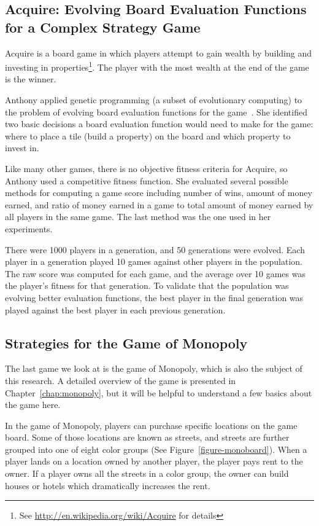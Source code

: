 \subsection{Acquire: Evolving Board Evaluation Functions for a Complex Strategy
Game}

Acquire is a board game in which players attempt to gain wealth by building and
investing in properties\footnote{See \url{http://en.wikipedia.org/wiki/Acquire}
for details}. The player with the most wealth at the end of the game is the
winner.

Anthony applied genetic programming (a subset of evolutionary computing) to the
problem of evolving board evaluation functions for the game~\cite{Anthony2002}.
She identified two basic decisions a board evaluation function would need to
make for the game: where to place a tile (build a property) on the board and
which property to invest in.

Like many other games, there is no objective fitness criteria for Acquire, so
Anthony used a competitive fitness function. She evaluated several possible
methods for computing a game score including number of wins, amount of money
earned, and ratio of money earned in a game to total amount of money earned by
all players in the same game. The last method was the one used in her
experiments.

There were 1000 players in a generation, and 50 generations were evolved. Each
player in a generation played 10 games against other players in the population.
The raw score was computed for each game, and the average over 10 games was the
player's fitness for that generation. To validate that the population was
evolving better evaluation functions, the best player in the final generation
was played against the best player in each previous generation.

\subsection{Strategies for the Game of Monopoly}

The last game we look at is the game of Monopoly, which is also the subject
of this research. A detailed overview of the game is presented in
Chapter~\ref{chap:monopoly}, but it will be helpful to understand a few basics
about the game here.

In the game of Monopoly, players can purchase specific locations on the game
board. Some of those locations are known as streets, and streets are further
grouped into one of eight color groups (See Figure~\ref{figure-monoboard}). When
a player lands on a location owned by another player, the player pays rent to
the owner. If a player owns all the streets in a color group, the owner can
build houses or hotels which dramatically increases the rent.

